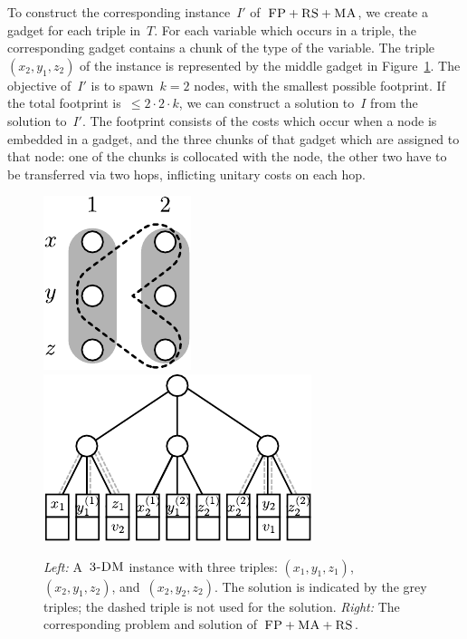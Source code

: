 \documentclass[preprint,12pt]{elsarticle}
\newcommand{\FP}{\textsc{FP}}
\newcommand{\RS}{\textsc{RS}}
\newcommand{\MA}{\textsc{MA}}
\newcommand{\TDM}{\textsc{3-DM}}
\begin{document}
To construct the corresponding instance~$I'$ of~$\FP+\RS+\MA$, we
create a gadget for each triple in~$T$. For each variable which occurs in a
triple, the corresponding gadget contains a chunk of the
type of the variable. The triple
$(x_2, y_1, z_2)$ of the instance is represented by the middle gadget in
Figure~\ref{fig:fprsma}. The objective of~$I'$ is to spawn~$k=2$ nodes,
with the smallest possible footprint. If the total footprint is~$\leq
2\cdot2\cdot k$, we can construct a solution to~$I$ from the solution to~$I'$.
The footprint consists of the costs which occur when a node is embedded in a
gadget, and the three chunks of that gadget which are assigned to that node: one of
the chunks is collocated with the node, the other two have to be transferred
via two hops, inflicting unitary costs on each hop.
\begin{figure}[t]
\includegraphics[width = 0.3\columnwidth]{figs/np_3dm_formular}
\hfill
\includegraphics[width = 0.6\columnwidth]{figs/np_3dm_construction}
\caption{\textit{Left:} A~$\TDM$ instance with three triples:
$(x_1, y_1, z_1)$,~$(x_2, y_1, z_2)$, and~$(x_2, y_2, z_2)$. The solution is
indicated by the grey triples; the dashed triple is not used for the
solution. \textit{Right:} The corresponding problem and solution of~$\FP + \MA
+ \RS$.}
\label{fig:fprsma}
\end{figure}
\end{document}
